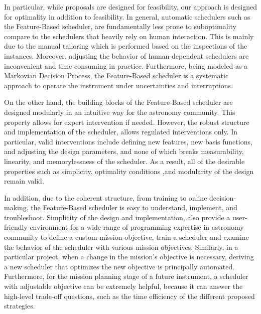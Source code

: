 \documentclass[12pt]{aastex62}
\theoremstyle{definition}
\begin{document}
In particular, while proposals are designed for feasibility, our approach is designed for optimality in addition to feasibility. In general, automatic schedulers such as the Feature-Based scheduler, are fundamentally less prone to suboptimality compare to the schedulers that heavily rely on human interaction. This is mainly due to the manual tailoring which is performed based on the inspections of the instances. Moreover, adjusting the behavior of human-dependent schedulers are inconvenient and time consuming in practice. Furthermore, being modeled as a Markovian Decision Process, the Feature-Based scheduler is a systematic approach to operate the instrument under uncertainties and interruptions.

On the other hand, the building blocks of the Feature-Based scheduler are designed modularly in an intuitive way for the astronomy community. This property allows for expert intervention if needed. However, the robust structure and implementation of the scheduler, allows regulated interventions only. In particular, valid interventions include defining new features, new basis functions, and adjusting the design parameters, and none of which breaks measurability, linearity, and memorylessness of the scheduler. As a result, all of the desirable properties such as simplicity, optimality conditions ,and modularity of the design remain valid. 

In addition, due to the coherent structure, from training to online decision-making, the Feature-Based scheduler is easy to understand, implement, and troubleshoot. Simplicity of the design and implementation, also provide a user-friendly environment for a wide-range of programming expertise in astronomy community to define a custom mission objective, train a scheduler and examine the behavior of the scheduler with various mission objectives. Similarly, in a particular project, when a change in the mission's objective is necessary, deriving a new scheduler that optimizes the new objective is principally automated. Furthermore, for the mission planning stage of a future instrument, a scheduler with adjustable objective can be extremely helpful, because it can answer the high-level trade-off questions, such as the time efficiency of the different proposed strategies.
\end{document}
